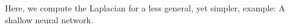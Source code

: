 Here, we compute the Laplacian for a less general, yet simpler, example: A shallow neural network.

\begin{comment}
  For the one-dimensional shallow case we have
  \[ u_\theta(x) = \sum_{i=1}^m a_i\sigma(b_i x + c_i) + d. \]
  Then
  \[ u_\theta'(x) = \sum_{i=1}^m a_ib_i\sigma'(b_i x + c_i) \]
  and
  \[ u_\theta''(x) = \sum_{i=1}^m a_ib_i^2\sigma''(b_i x + c_i). \]
  The parameter derivative of the Laplacian (i.e., second-order derivative)
  \begin{align*}
    \partial_{a_i}u_\theta''(x) & = b_i^2\sigma''(b_i x + c_i) \\
    \partial_{b_i}u_\theta''(x) & = 2a_ib_i\sigma''(b_i x + c_i) + a_i b_i^2x\sigma^{(3)}(b_i x + c_i) \\
    \partial_{c_i}u_\theta''(x) & = a_i b_i^2\sigma^{(3)}(b_i x + c_i) \\
    \partial_{d}u_\theta''(x) & = 0.
  \end{align*}
  The parameter derivative of the Laplacian (i.e., second-order derivative)
  \begin{align*}
    \partial_{a_i}u_\theta''(x) & = b_i^2\sigma''(b_i x + c_i) \\
    \partial_{b_i}u_\theta''(x) & = 2a_ib_i\sigma''(b_i x + c_i) + a_i b_i^2x\sigma^{(3)}(b_i x + c_i) \\
    \partial_{c_i}u_\theta''(x) & = a_i b_i^2\sigma^{(3)}(b_i x + c_i) \\
    \partial_{d}u_\theta''(x) & = 0.
  \end{align*}
\end{comment}


